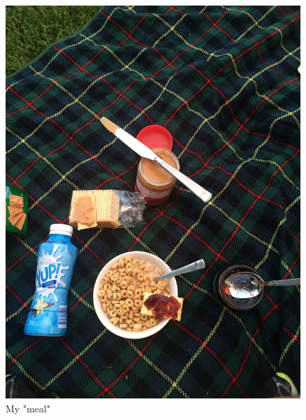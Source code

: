 \documentclass[11pt]{article}
\begin{document}
\begin{figure}[H]
    \centering
    \includegraphics[width=160mm]{resources/meal.jpg}
    \caption{My "meal"}
\end{figure}
\end{document}
